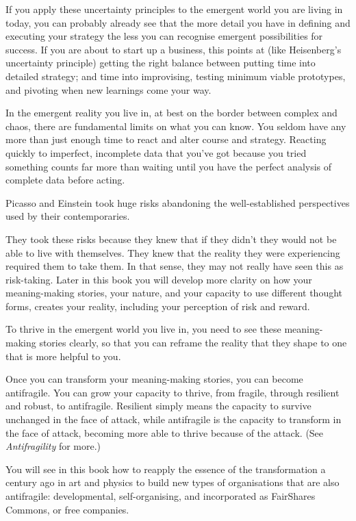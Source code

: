 If you apply these uncertainty principles to the emergent world you are living in today, you can probably already see that the more detail you have in defining and executing your strategy the less you can recognise emergent possibilities for success. If you are about to start up a business, this points at (like Heisenberg’s uncertainty principle) getting the right balance between putting time into detailed strategy; and time into improvising, testing minimum viable prototypes, and pivoting when new learnings come your way.


In the emergent reality you live in, at best on the border between complex and chaos, there are fundamental limits on what you can know. You seldom have any more than just enough time to react and alter course and strategy. Reacting quickly to imperfect, incomplete data that you've got because you tried something counts far more than waiting until you have the perfect analysis of complete data before acting.


Picasso and Einstein took huge risks abandoning the well-established perspectives used by their contemporaries.


They took these risks because they knew that if they didn’t they would not be able to live with themselves. They knew that the reality they were experiencing required them to take them. In that sense, they may not really have seen this as risk-taking. Later in this book you will develop more clarity on how your meaning\hyp{}making stories, your nature, and your capacity to use different thought forms, creates your reality, including your perception of risk and reward.


To thrive in the emergent world you live in, you need to see these meaning\hyp{}making stories clearly, so that you can reframe the reality that they shape to one that is more helpful to you.


Once you can transform your meaning\hyp{}making stories, you can become antifragile. You can grow your capacity to thrive, from fragile, through resilient and robust, to antifragile. Resilient simply means the capacity to survive unchanged in the face of attack, while antifragile is the capacity to transform in the face of attack, becoming more able to thrive because of the attack. (See \emph{Antifragility}\cite{taleb-antifragile} for more.)


You will see in this book how to reapply the essence of the transformation a century ago in art and physics to build new types of organisations that are also antifragile: developmental, self-organising, and incorporated as FairShares Commons, or free companies. 


